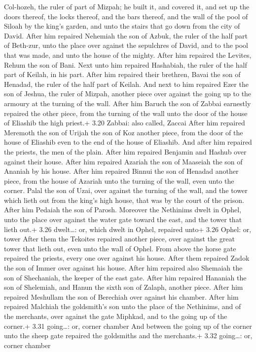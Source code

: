 Col-hozeh, the ruler of part of Mizpah; he built it, and covered it, and
set up the doors thereof, the locks thereof, and the bars thereof, and
the wall of the pool of Siloah by the king's garden, and unto the stairs
that go down from the city of David.  After him repaired
Nehemiah the son of Azbuk, the ruler of the half part of Beth-zur, unto
the place over against the sepulchres of David, and to the pool that was
made, and unto the house of the mighty.  After him repaired
the Levites, Rehum the son of Bani. Next unto him repaired Hashabiah,
the ruler of the half part of Keilah, in his part.  After
him repaired their brethren, Bavai the son of Henadad, the ruler of the
half part of Keilah.  And next to him repaired Ezer the son
of Jeshua, the ruler of Mizpah, another piece over against the going up
to the armoury at the turning of the wall.  After him
Baruch the son of Zabbai earnestly repaired the other piece, from the
turning of the wall unto the door of the house of Eliashib the high
priest.+ 3.20 Zabbai: also called, Zaccai  After him
repaired Meremoth the son of Urijah the son of Koz another piece, from
the door of the house of Eliashib even to the end of the house of
Eliashib.  And after him repaired the priests, the men of
the plain.  After him repaired Benjamin and Hashub over
against their house. After him repaired Azariah the son of Maaseiah the
son of Ananiah by his house.  After him repaired Binnui the
son of Henadad another piece, from the house of Azariah unto the turning
of the wall, even unto the corner.  Palal the son of Uzai,
over against the turning of the wall, and the tower which lieth out from
the king's high house, that was by the court of the prison. After him
Pedaiah the son of Parosh.  Moreover the Nethinims dwelt in
Ophel, unto the place over against the water gate toward the east, and
the tower that lieth out.+ 3.26 dwelt\ldots: or, which dwelt in Ophel,
repaired unto+ 3.26 Ophel: or, tower  After them the
Tekoites repaired another piece, over against the great tower that lieth
out, even unto the wall of Ophel.  From above the horse
gate repaired the priests, every one over against his house.
 After them repaired Zadok the son of Immer over against
his house. After him repaired also Shemaiah the son of Shechaniah, the
keeper of the east gate.  After him repaired Hananiah the
son of Shelemiah, and Hanun the sixth son of Zalaph, another piece.
After him repaired Meshullam the son of Berechiah over against his
chamber.  After him repaired Malchiah the goldsmith's son
unto the place of the Nethinims, and of the merchants, over against the
gate Miphkad, and to the going up of the corner.+ 3.31 going\ldots: or,
corner chamber  And between the going up of the corner unto
the sheep gate repaired the goldsmiths and the merchants.+ 3.32
going\ldots: or, corner chamber

